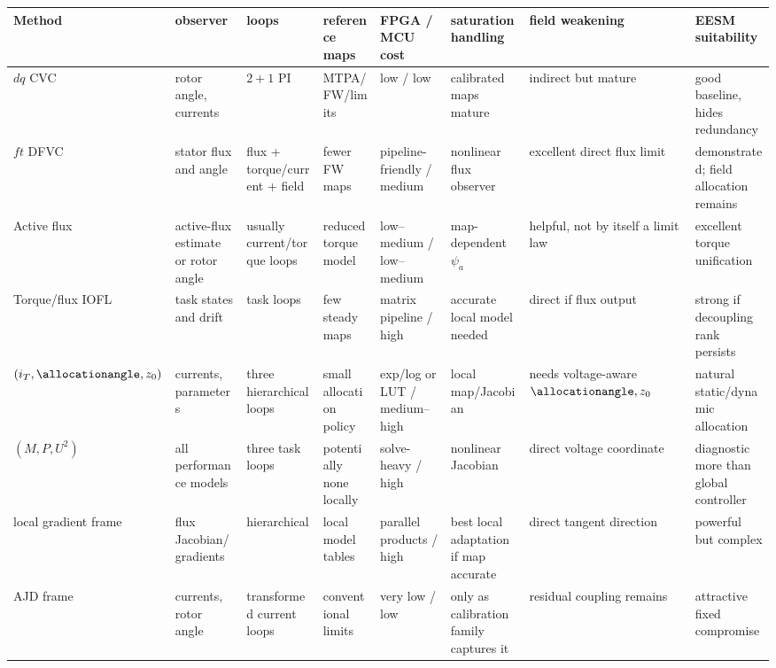 \begin{landscape}
\begin{standalonetable}
\label{tab:coordinate-comparison-implementation}
\begin{tabularx}{\linewidth}{lXXXXXXX}
\toprule
Method & observer & loops & reference maps & FPGA / MCU cost & saturation
handling & field weakening & EESM suitability\\
\midrule
\(dq\) CVC & rotor angle, currents & \(2+1\) PI & MTPA/FW/limits & low / low &
calibrated maps mature & indirect but mature & good baseline, hides redundancy\\
\(ft\) DFVC & stator flux and angle & flux + torque/current + field & fewer FW maps &
pipeline-friendly / medium & nonlinear flux observer & excellent direct flux limit & demonstrated; field allocation remains\\
Active flux & active-flux estimate or rotor angle & usually current/torque loops & reduced torque model &
low--medium / low--medium & map-dependent \(\psi_a\) & helpful, not by itself a limit law & excellent torque unification\\
Torque/flux IOFL & task states and drift & task loops & few steady maps &
matrix pipeline / high & accurate local model needed & direct if flux output & strong if decoupling rank persists\\
\((i_T,\allocationangle,z_0)\) & currents, parameters & three hierarchical loops & small allocation policy &
exp/log or LUT / medium--high & local map/Jacobian & needs voltage-aware \(\allocationangle,z_0\) & natural static/dynamic allocation\\
\((M,P,U^2)\) & all performance models & three task loops & potentially none locally &
solve-heavy / high & nonlinear Jacobian & direct voltage coordinate & diagnostic more than global controller\\
local gradient frame & flux Jacobian/gradients & hierarchical & local model tables &
parallel products / high & best local adaptation if map accurate & direct tangent direction & powerful but complex\\
AJD frame & currents, rotor angle & transformed current loops & conventional limits &
very low / low & only as calibration family captures it & residual coupling remains & attractive fixed compromise\\
\bottomrule
\end{tabularx}
\end{standalonetable}
\end{landscape}

